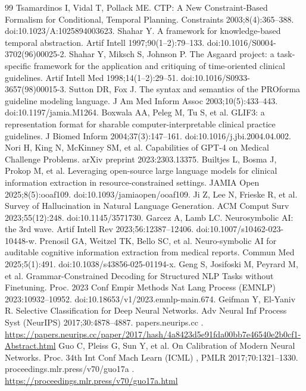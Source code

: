 \documentclass[3p,twocolumn]{elsarticle}
\begin{document}
\begin{thebibliography}{99}
\label{r52} Tsamardinos I, Vidal T, Pollack ME. CTP: A New Constraint-Based Formalism for Conditional, Temporal Planning. Constraints 2003;8(4):365--388. doi:10.1023/A:1025894003623.
\label{r53} Shahar Y. A framework for knowledge-based temporal abstraction. Artif Intell 1997;90(1--2):79--133. doi:10.1016/S0004-3702(96)00025-2.
\label{r54} Shahar Y, Miksch S, Johnson P. The Asgaard project: a task-specific framework for the application and critiquing of time-oriented clinical guidelines. Artif Intell Med 1998;14(1--2):29--51. doi:10.1016/S0933-3657(98)00015-3.
\label{r55} Sutton DR, Fox J. The syntax and semantics of the PROforma guideline modeling language. J Am Med Inform Assoc 2003;10(5):433--443. doi:10.1197/jamia.M1264.
\label{r56} Boxwala AA, Peleg M, Tu S, et al. GLIF3: a representation format for sharable computer-interpretable clinical practice guidelines. J Biomed Inform 2004;37(3):147--161. doi:10.1016/j.jbi.2004.04.002.
\label{r57} Nori H, King N, McKinney SM, et al. Capabilities of GPT-4 on Medical Challenge Problems. arXiv preprint 2023:2303.13375.
\label{r58} Builtjes L, Bosma J, Prokop M, et al. Leveraging open-source large language models for clinical information extraction in resource-constrained settings. JAMIA Open 2025;8(5):ooaf109. doi:10.1093/jamiaopen/ooaf109.
\label{r59} Ji Z, Lee N, Frieske R, et al. Survey of Hallucination in Natural Language Generation. ACM Comput Surv 2023;55(12):248. doi:10.1145/3571730.
\label{r60} Garcez A, Lamb LC. Neurosymbolic AI: the 3rd wave. Artif Intell Rev 2023;56:12387--12406. doi:10.1007/s10462-023-10448-w.
\label{r61} Prenosil GA, Weitzel TK, Bello SC, et al. Neuro-symbolic AI for auditable cognitive information extraction from medical reports. Commun Med 2025;5(1):491. doi:10.1038/s43856-025-01194-x.
\label{r62} Geng S, Josifoski M, Peyrard M, et al. Grammar-Constrained Decoding for Structured NLP Tasks without Finetuning. Proc. 2023 Conf Empir Methods Nat Lang Process (EMNLP) 2023:10932--10952. doi:10.18653/v1/2023.emnlp-main.674.
\label{r63} Geifman Y, El-Yaniv R. Selective Classification for Deep Neural Networks. Adv Neural Inf Process Syst (NeurIPS) 2017;30:4878--4887. papers.neurips.cc . \url{https://papers.neurips.cc/paper/2017/hash/4a8423d5e91fda00bb7e46540e2b0cf1-Abstract.html}
\label{r64} Guo C, Pleiss G, Sun Y, et al. On Calibration of Modern Neural Networks. Proc. 34th Int Conf Mach Learn (ICML) , PMLR 2017;70:1321--1330. proceedings.mlr.press/v70/guo17a . \url{https://proceedings.mlr.press/v70/guo17a.html}

\end{thebibliography}
\end{document}
